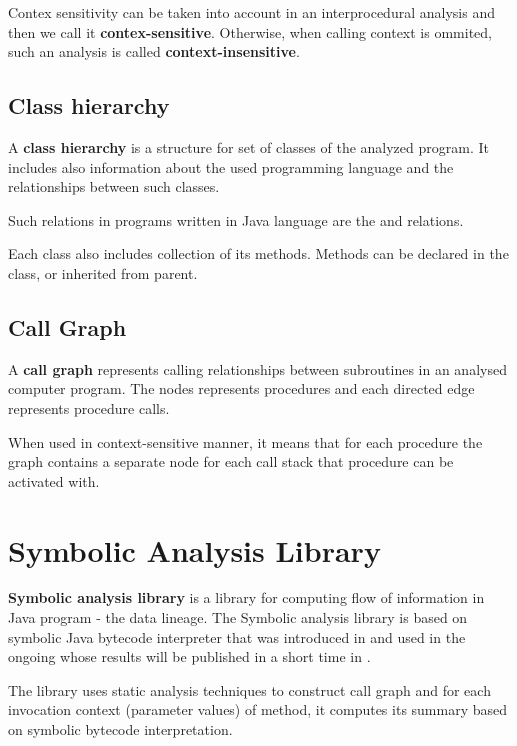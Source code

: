 Contex sensitivity can be taken into account in an interprocedural analysis and
then we call it \textbf{contex-sensitive}. Otherwise, when calling context is ommited,
such an analysis is called \textbf{context-insensitive}.




\subsection{Class hierarchy}

A \textbf{class hierarchy} is a structure for set of classes
of the analyzed program. It includes also information about the used
programming language and the relationships between such classes.

Such relations in programs written in Java language are the  and 
relations.

Each class also includes collection of its methods. Methods can be declared in the
class, or inherited from parent.



\subsection{Call Graph}

A \textbf{call graph} represents calling relationships between subroutines
in an analysed computer program. The nodes represents procedures and each
directed edge represents procedure calls.

When used in context-sensitive manner, it means that for each procedure 
the graph contains a separate node for each call stack that procedure can be
activated with.




\section{Symbolic Analysis Library \label{chapter:analysis:symbolicAnalysisLibrary}}

\textbf{Symbolic analysis library} is a library for computing flow of information
in Java program - the data lineage.
The Symbolic analysis library is based on symbolic Java bytecode interpreter
that was introduced in \citet{ParizekHybridAnalysis}
and used in the ongoing whose results will be published
in a short time in \citet{ParizekBUBEN}.

The library uses static analysis techniques to construct call graph and
for each invocation context (parameter values) of method,
it computes its summary based on symbolic bytecode interpretation.

